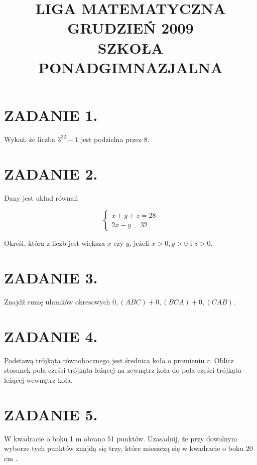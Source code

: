 \documentclass[10pt]{article}
\title{LIGA MATEMATYCZNA \\
 GRUDZIEŃ 2009 \\
 SZKOŁA PONADGIMNAZJALNA }
\author{}
\date{}
\begin{document}
\maketitle
\section*{ZADANIE 1.}
Wykaż, że liczba \(3^{32}-1\) jest podzielna przez 8.

\section*{ZADANIE 2.}
Dany jest układ równań

\[
\left\{\begin{array}{l}
x+y+z=28 \\
2 x-y=32
\end{array}\right.
\]

Określ, która z liczb jest większa \(x\) czy \(y\), jeżeli \(x>0, y>0\) i \(z>0\).

\section*{ZADANIE 3.}
Znajdź sumę ułamków okresowych \(0,(A B C)+0,(B C A)+0,(C A B)\).

\section*{ZADANIE 4.}
Podstawą trójkąta równobocznego jest średnica koła o promieniu \(r\). Oblicz stosunek pola części trójkąta leżącej na zewnątrz koła do pola części trójkąta leżącej wewnątrz koła.

\section*{ZADANIE 5.}
W kwadracie o boku 1 m obrano 51 punktów. Uzasadnij, że przy dowolnym wyborze tych punktów znajdą się trzy, które mieszczą się w kwadracie o boku 20 cm .
\end{document}
